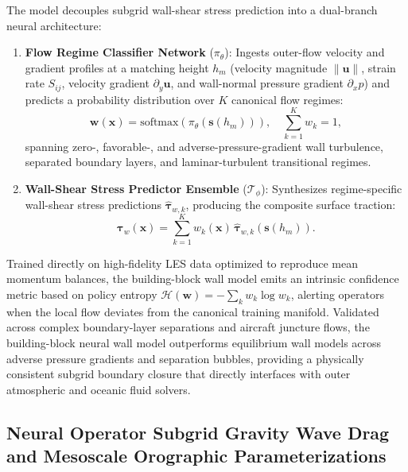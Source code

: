 The model decouples subgrid wall-shear stress prediction into a dual-branch neural architecture:
\begin{enumerate}
    \item \textbf{Flow Regime Classifier Network} ($\pi_\theta$): Ingests outer-flow velocity and gradient profiles at a matching height $h_m$ (velocity magnitude $\|\mathbf{u}\|$, strain rate $S_{ij}$, velocity gradient $\partial_y \mathbf{u}$, and wall-normal pressure gradient $\partial_x p$) and predicts a probability distribution over $K$ canonical flow regimes:
    \begin{equation}
        \mathbf{w}(\mathbf{x}) = \text{softmax}\left( \pi_\theta(\mathbf{s}(h_m)) \right), \quad \sum_{k=1}^K w_k = 1,
        \label{eq:wmles_weights}
    \end{equation}
    spanning zero-, favorable-, and adverse-pressure-gradient wall turbulence, separated boundary layers, and laminar-turbulent transitional regimes.
    \item \textbf{Wall-Shear Stress Predictor Ensemble} ($\mathcal{T}_\phi$): Synthesizes regime-specific wall-shear stress predictions $\hat{\boldsymbol{\tau}}_{w, k}$, producing the composite surface traction:
    \begin{equation}
        \boldsymbol{\tau}_w(\mathbf{x}) = \sum_{k=1}^K w_k(\mathbf{x}) \, \hat{\boldsymbol{\tau}}_{w, k}(\mathbf{s}(h_m)).
        \label{eq:wmles_stress}
    \end{equation}
\end{enumerate}
Trained directly on high-fidelity LES data optimized to reproduce mean momentum balances, the building-block wall model emits an intrinsic confidence metric based on policy entropy $\mathcal{H}(\mathbf{w}) = -\sum_k w_k \log w_k$, alerting operators when the local flow deviates from the canonical training manifold. Validated across complex boundary-layer separations and aircraft juncture flows, the building-block neural wall model outperforms equilibrium wall models across adverse pressure gradients and separation bubbles, providing a physically consistent subgrid boundary closure that directly interfaces with outer atmospheric and oceanic fluid solvers.

\subsection{Neural Operator Subgrid Gravity Wave Drag and Mesoscale Orographic Parameterizations}
\label{sec:gravity_wave_drag}

